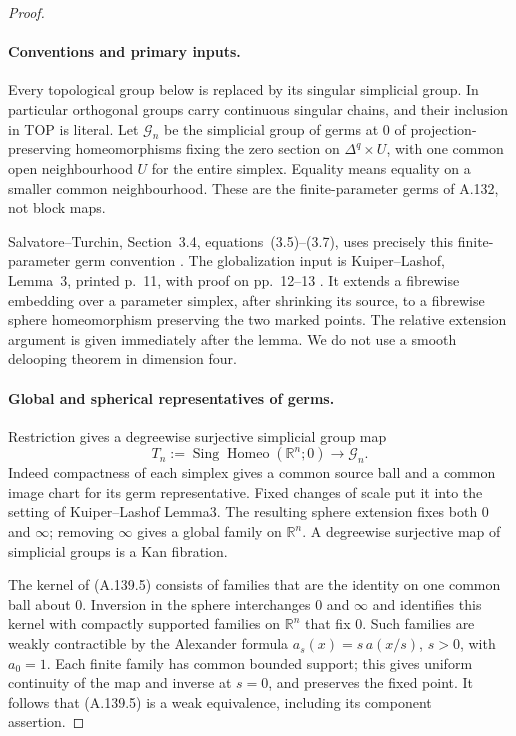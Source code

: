 \begin{proof}
\paragraph{Conventions and primary inputs.}
Every topological group below is replaced by its singular simplicial
group. In particular orthogonal groups carry continuous singular
chains, and their inclusion in TOP is literal. Let $\mathcal G_n$
be the simplicial group of germs at $0$ of projection-preserving
homeomorphisms fixing the zero section on $\Delta^q\times U$, with one common open
neighbourhood $U$ for the entire simplex. Equality means equality
on a smaller common neighbourhood. These are the finite-parameter
germs of A.132, not block maps.

Salvatore--Turchin, Section~3.4, equations~(3.5)--(3.7),
uses precisely this finite-parameter germ convention
\cite{SalvatoreTurchin2026}. The globalization input is
Kuiper--Lashof, Lemma~3, printed p.~11, with proof on pp.~12--13
\cite{KuiperLashof1966I}. It extends a fibrewise embedding over a
parameter simplex, after shrinking its source, to a fibrewise sphere
homeomorphism preserving the two marked points. The relative
extension argument is given immediately after the lemma.
We do not use a smooth delooping theorem in dimension four.

\paragraph{Global and spherical representatives of germs.}
Restriction gives a degreewise surjective simplicial group map
\[
 T_n:=\operatorname{Sing}\operatorname{Homeo}(\mathbb R^n;0)
        \longrightarrow\mathcal G_n.                  \tag{A.139.5}
\]
Indeed compactness of each simplex gives a common source ball and
a common image chart for its germ representative. Fixed changes of
scale put it into the setting of Kuiper--Lashof Lemma3. The resulting
sphere extension fixes both $0$ and $\infty$; removing $\infty$
gives a global family on $\mathbb R^n$. A degreewise surjective
map of simplicial groups is a Kan fibration.

The kernel of (A.139.5) consists of families that are the identity on
one common ball about $0$. Inversion in the sphere interchanges
$0$ and $\infty$ and identifies this kernel with compactly
supported families on $\mathbb R^n$ that fix $0$. Such families
are weakly contractible by the Alexander formula
$a_s(x)=s\,a(x/s)$, $s>0$, with $a_0=1$.
Each finite family has common bounded support; this gives uniform
continuity of the map and inverse at $s=0$, and preserves the fixed
point. It follows that (A.139.5) is a weak equivalence, including its
component assertion.


\end{proof}
